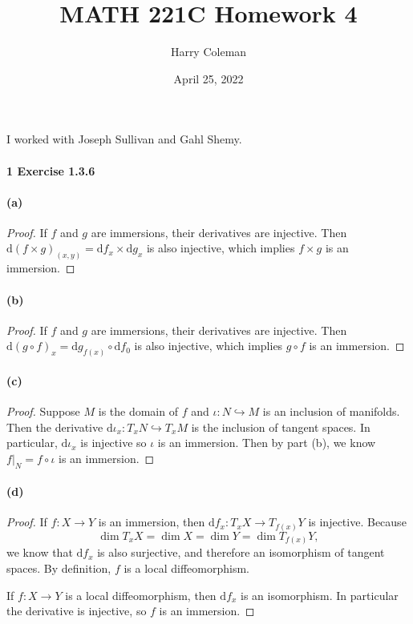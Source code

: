 \documentclass[12pt]{article}
\renewcommand{\maketitle}{\thispagestyle{title}}
\newlength{\myparskip}
\newenvironment{fullbox}{\begin{lrbox}{\savefullbox}\begin{minipage}{\dimexpr\textwidth-2\fboxsep\relax}\setlength{\parskip}{\myparskip}}{\end{minipage}\end{lrbox}\framebox[\textwidth]{\usebox{\savefullbox}}}
\newenvironment{pbox}[1][]{\begin{fullbox}\def\temp{#1}\ifx\temp\empty\else\paragraph{#1}\phantom{}\fi}{\end{fullbox}}
\theoremstyle{definition}
\newcommand{\<}{\langle}
\renewcommand{\>}{\rangle}
\newcommand{\inc}{\hookrightarrow}
\newcommand{\dd}{\mathrm{d}}
\begin{document}
\title{MATH 221C Homework 4}
\author{Harry Coleman}
\date{April 25, 2022}
\maketitle

I worked with Joseph Sullivan and Gahl Shemy.

\begin{pbox}[1 Exercise 1.3.6]
\end{pbox}

\begin{pbox}[(a)]
\end{pbox}

\begin{proof}
    If $f$ and $g$ are immersions, their derivatives are injective.
    Then $\dd(f \times g)_(x, y) = \dd{f}_x \times \dd{g}_x$ is also injective, which implies $f \times g$ is an immersion.
\end{proof}

\begin{pbox}[(b)]
\end{pbox}

\begin{proof}
    If $f$ and $g$ are immersions, their derivatives are injective.
    Then $\dd(g \circ f)_x = \dd{g}_{f(x)} \circ \dd{f}_0$ is also injective, which implies $g \circ f$ is an immersion.
\end{proof}

\begin{pbox}[(c)]
\end{pbox}

\begin{proof}
    Suppose $M$ is the domain of $f$ and $\iota : N \inc M$ is an inclusion of manifolds.
    Then the derivative $\dd{\iota}_x : T_xN \inc T_xM$ is the inclusion of tangent spaces.
    In particular, $\dd{\iota}_x$ is injective so $\iota$ is an immersion.
    Then by part (b), we know $f|_N = f \circ \iota$ is an immersion.
\end{proof}

\begin{pbox}[(d)]
\end{pbox}

\begin{proof}
    If $f : X \to Y$ is an immersion, then $\dd{f}_x : T_xX \to T_{f(x)}Y$ is injective.
    Because
    \[
        \dim T_xX = \dim X = \dim Y = \dim T_{f(x)} Y,
    \]
    we know that $\dd{f}_x$ is also surjective, and therefore an isomorphism of tangent spaces.
    By definition, $f$ is a local diffeomorphism.

    If $f : X \to Y$ is a local diffeomorphism, then $\dd{f}_x$ is an isomorphism.
    In particular the derivative is injective, so $f$ is an immersion.
\end{proof}
\end{document}

